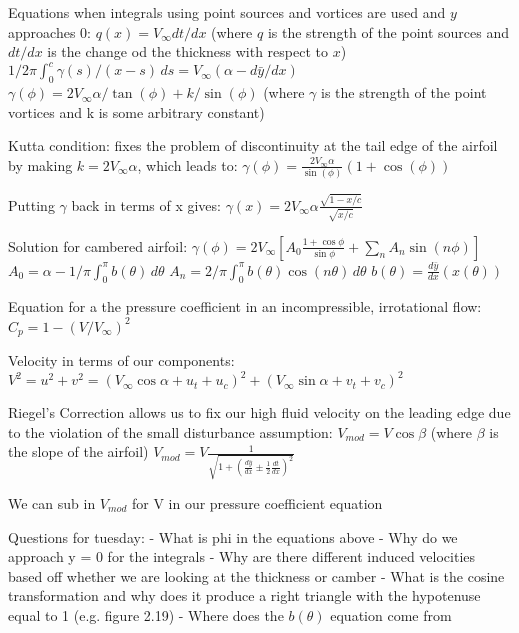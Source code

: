 \documentclass[12pt, letterpaper]{article}
\begin{document}
Equations when integrals using point sources and vortices are used and $y$ approaches $0$:
$q(x)=V_\infty dt/dx$ (where $q$ is the strength of the point sources and $dt/dx$ is the change od the thickness with respect to $x$)
$1/2\pi \int_{0}^{c} \gamma(s)/(x-s) \,ds = V_\infty (\alpha - d\bar{y}/dx)$
$\gamma(\phi) = 2V_\infty\alpha/\tan(\phi) + k/\sin(\phi)$ (where $\gamma$ is the strength of the point vortices and k is some arbitrary constant)

Kutta condition: fixes the problem of discontinuity at the tail edge of the airfoil by making $k = 2V_\infty\alpha$, which leads to:
$\gamma(\phi) = \frac{2V_\infty\alpha}{\sin(\phi)} (1+\cos(\phi))$

Putting $\gamma$ back in terms of x gives:
$\gamma(x) = 2V_\infty\alpha\frac{\sqrt{1-x/c}}{\sqrt{x/c}}$

Solution for cambered airfoil:
$\gamma(\phi) = 2V_\infty[A_0\frac{1+\cos\phi}{\sin\phi}+\sum_{n} A_n\sin(n\phi)]$
$A_0 = \alpha-1/\pi\int_{0}^{\pi} b(\theta)\, d\theta$
$A_n = 2/\pi\int_{0}^{\pi} b(\theta)\cos(n\theta)\, d\theta$
$b(\theta) = \frac{d\bar{y}}{dx}(x(\theta))$

Equation for a the pressure coefficient in an incompressible, irrotational flow:
$C_p = 1-(V/V_\infty)^2$

Velocity in terms of our components:
$V^2=u^2+v^2=(V_\infty\cos\alpha+u_t+u_c)^2+(V_\infty\sin\alpha+v_t+v_c)^2$ 

Riegel's Correction allows us to fix our high fluid velocity on the leading edge due to the violation of the small disturbance assumption:
$V_{mod}= V\cos\beta$ (where $\beta$ is the slope of the airfoil)
$V_{mod} = V\frac{1}{\sqrt{1+(\frac{d\bar{y}}{dx}\pm\frac{1}{2}\frac{dt}{dx})^2}}$

We can sub in $V_{mod}$ for V in our pressure coefficient equation


Questions for tuesday:
- What is phi in the equations above
- Why do we approach y = 0 for the integrals
- Why are there different induced velocities based off whether we are looking at the thickness or camber 
- What is the cosine transformation and why does it produce a right triangle with the hypotenuse equal to 1 (e.g. figure 2.19)
- Where does the $b(\theta)$ equation come from
\end{document}
